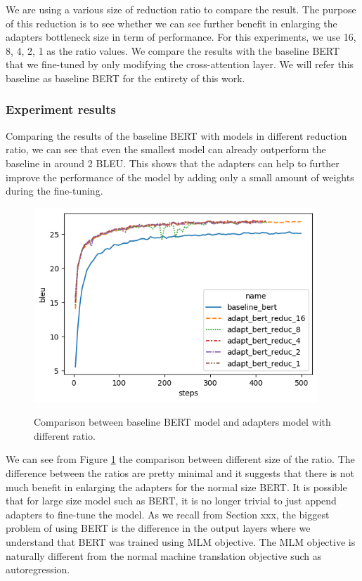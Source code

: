 We are using a various size of reduction ratio to compare the result. The purpose of this reduction is to see whether we can see further benefit in enlarging the adapters bottleneck size in term of performance. For this experiments, we use 16, 8, 4, 2, 1 as the ratio values. We compare the results with the baseline BERT that we fine-tuned by only modifying the cross-attention layer. We will refer this baseline as baseline BERT for the entirety of this work.

\subsubsection{Experiment results}
Comparing the results of the baseline BERT with models in different reduction ratio, we can see that even the smallest model can already outperform the baseline in around 2 BLEU. This shows that the adapters can help to further improve the performance of the model by adding only a small amount of weights during the fine-tuning.

\begin{figure}[h]
    {\includegraphics[width=0.95\textwidth]{img/adapter_bert_baseline_adapters.png}}
    \centering
    \caption{Comparison between baseline BERT model and adapters model with different ratio.}
    \label{img:adapt_bert_ratio}
\end{figure}

We can see from Figure \ref{img:adapt_bert_ratio} the comparison between different size of the ratio. The difference between the ratios are pretty minimal and it suggests that there is not much benefit in enlarging the adapters for the normal size BERT. It is possible that for large size model such as BERT, it is no longer trivial to just append adapters to fine-tune the model. As we recall from Section xxx, the biggest problem of using BERT is the difference in the output layers where we understand that BERT was trained using MLM objective. The MLM objective is naturally different from the normal machine translation objective such as autoregression.

